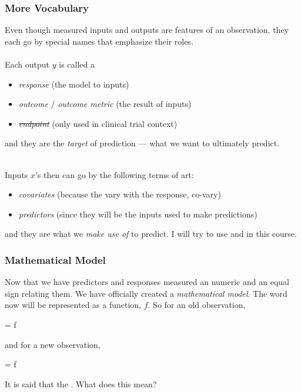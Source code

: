 \documentclass[slides]{beamer} %
\begin{document}
\begin{frame}\frametitle{More Vocabulary}

\small
Even though measured inputs and outputs are features of an observation, they each go by special names that emphasize their roles. \\~\\

Each output $y$ is called a

\begin{itemize}
\item \textit{response} (the model  to inputs)
\item \textit{outcome} / \textit{outcome metric} (the result of inputs)
\item \sout{\textit{endpoint}} (only used in clinical trial context)
\end{itemize}

and they are the \emph{target} of prediction --- what we want to ultimately predict. \\~\\ \pause 

Inputs $x$'s then can go by the following terms of art:

\begin{itemize}
\item \textit{covariates} (because the vary with the response, co-vary)
\item \textit{predictors} (since they will be the inputs used to make predictions)
\end{itemize}

and they are what we \emph{make use of} to predict. I will try to use  and  in this course.

\end{frame}


\begin{frame}\frametitle{Mathematical Model}

Now that we have predictors and responses measured an numeric and an equal sign relating them. We have officially created a \textit{mathematical model}. The word  now will be represented as a function, $f$.  \pause So for an old observation,

\beqn
{} = f 
\eeqn

and for a new observation, \pause 

\beqn
{} = f 
\eeqn

It is said that the . What does this mean?
	
\end{frame}
\end{document}
